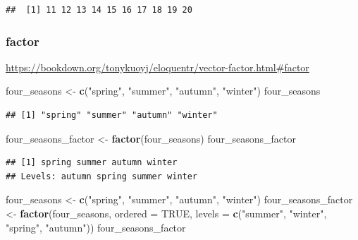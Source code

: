 \documentclass[
]{book}
\newenvironment{Shaded}{\begin{snugshade}}{\end{snugshade}}
\newcommand{\AttributeTok}[1]{\textcolor[rgb]{0.13,0.29,0.53}{#1}}
\newcommand{\ConstantTok}[1]{\textcolor[rgb]{0.56,0.35,0.01}{#1}}
\newcommand{\FunctionTok}[1]{\textcolor[rgb]{0.13,0.29,0.53}{\textbf{#1}}}
\newcommand{\NormalTok}[1]{#1}
\newcommand{\OtherTok}[1]{\textcolor[rgb]{0.56,0.35,0.01}{#1}}
\newcommand{\StringTok}[1]{\textcolor[rgb]{0.31,0.60,0.02}{#1}}
\theoremstyle{definition}
\theoremstyle{definition}
\theoremstyle{definition}
\theoremstyle{definition}
\theoremstyle{remark}
\begin{document}
\begin{verbatim}
##  [1] 11 12 13 14 15 16 17 18 19 20
\end{verbatim}

\subsubsection{factor}\label{factor}

\url{https://bookdown.org/tonykuoyj/eloquentr/vector-factor.html\#factor}

\begin{Shaded}
\begin{Highlighting}[]
\NormalTok{four\_seasons }\OtherTok{\textless{}{-}} \FunctionTok{c}\NormalTok{(}\StringTok{"spring"}\NormalTok{, }\StringTok{"summer"}\NormalTok{, }\StringTok{"autumn"}\NormalTok{, }\StringTok{"winter"}\NormalTok{)}
\NormalTok{four\_seasons}
\end{Highlighting}
\end{Shaded}

\begin{verbatim}
## [1] "spring" "summer" "autumn" "winter"
\end{verbatim}

\begin{Shaded}
\begin{Highlighting}[]
\NormalTok{four\_seasons\_factor }\OtherTok{\textless{}{-}} \FunctionTok{factor}\NormalTok{(four\_seasons)}
\NormalTok{four\_seasons\_factor}
\end{Highlighting}
\end{Shaded}

\begin{verbatim}
## [1] spring summer autumn winter
## Levels: autumn spring summer winter
\end{verbatim}

\begin{Shaded}
\begin{Highlighting}[]
\NormalTok{four\_seasons }\OtherTok{\textless{}{-}} \FunctionTok{c}\NormalTok{(}\StringTok{"spring"}\NormalTok{, }\StringTok{"summer"}\NormalTok{, }\StringTok{"autumn"}\NormalTok{, }\StringTok{"winter"}\NormalTok{)}
\NormalTok{four\_seasons\_factor }\OtherTok{\textless{}{-}} \FunctionTok{factor}\NormalTok{(four\_seasons, }\AttributeTok{ordered =} \ConstantTok{TRUE}\NormalTok{, }\AttributeTok{levels =} \FunctionTok{c}\NormalTok{(}\StringTok{"summer"}\NormalTok{, }\StringTok{"winter"}\NormalTok{, }\StringTok{"spring"}\NormalTok{, }\StringTok{"autumn"}\NormalTok{))}
\NormalTok{four\_seasons\_factor}
\end{Highlighting}
\end{Shaded}
\end{document}
